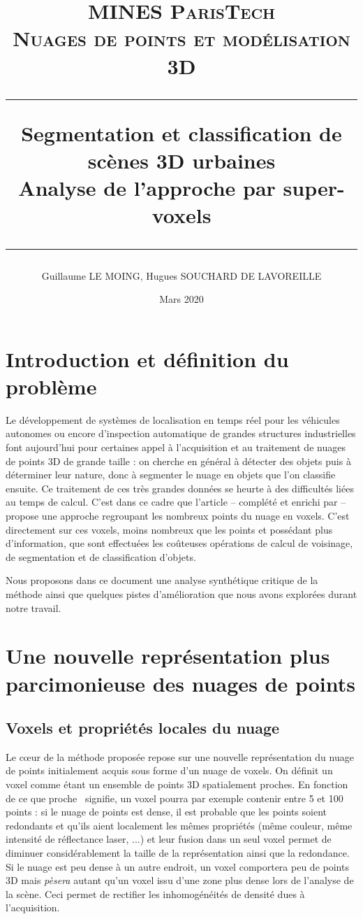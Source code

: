 \documentclass[a4paper, onecolumn, 11pt]{article}
\title{
\normalfont \normalsize
\textsc{MINES ParisTech\\ Nuages de points et modélisation 3D } \\
\vspace{2cm}\hrule\vspace{1cm}
\huge Segmentation et classification de scènes 3D urbaines \\Analyse de l'approche par super-voxels
\vspace{1cm}\hrule\vspace{1cm}
}
\author{Guillaume LE MOING, Hugues SOUCHARD DE LAVOREILLE}
\date{\vspace{12cm} Mars 2020}
\begin{document}
\maketitle

\tableofcontents

\section{Introduction et définition du problème}
Le développement de systèmes de localisation en temps réel pour les véhicules autonomes ou encore d'inspection automatique de grandes structures industrielles font aujourd'hui pour certaines appel à l'acquisition et au traitement de nuages de points 3D de grande taille : on cherche en général à détecter des objets puis à déterminer leur nature, donc à segmenter le nuage en objets que l'on classifie ensuite. Ce traitement de ces très grandes données se heurte à des difficultés liées au temps de calcul. C'est dans ce cadre que l'article \cite{aka_article} – complété et enrichi par \cite{aka_thesis} – propose une approche regroupant les nombreux points du nuage en voxels. C'est directement sur ces voxels, moins nombreux que les points et possédant plus d'information, que sont effectuées les coûteuses opérations de calcul de voisinage, de segmentation et de classification d'objets.

Nous proposons dans ce document une analyse synthétique critique de la méthode ainsi que quelques pistes d'amélioration que nous avons explorées durant notre travail.

\section{Une nouvelle représentation plus parcimonieuse des nuages de points}
\subsection{Voxels et propriétés locales du nuage}

Le cœur de la méthode proposée repose sur une nouvelle représentation du nuage de points initialement acquis sous forme d'un nuage de voxels. On définit un voxel comme étant un ensemble de points 3D spatialement proches. En fonction de ce que \og proche \fg\ signifie, un voxel pourra par exemple contenir entre 5 et 100 points : si le nuage de points est dense, il est probable que les points soient redondants et qu'ils aient localement les mêmes propriétés (même couleur, même intensité de réflectance laser, ...) et leur fusion dans un seul voxel permet de diminuer considérablement la taille de la représentation ainsi que la redondance. Si le nuage est peu dense à un autre endroit, un voxel comportera peu de points 3D mais \emph{pèsera} autant qu'un voxel issu d'une zone plus dense lors de l'analyse de la scène. Ceci permet de rectifier les inhomogénéités de densité dues à l'acquisition.
\end{document}
